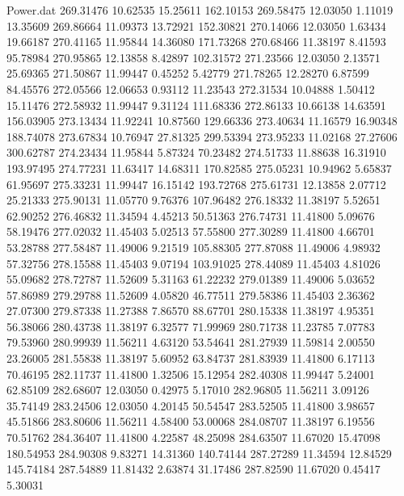 \begin{filecontents}{Power.dat}
 269.31476   10.62535   15.25611  162.10153
 269.58475   12.03050    1.11019   13.35609
 269.86664   11.09373   13.72921  152.30821
 270.14066   12.03050    1.63434   19.66187
 270.41165   11.95844   14.36080  171.73268
 270.68466   11.38197    8.41593   95.78984
 270.95865   12.13858    8.42897  102.31572
 271.23566   12.03050    2.13571   25.69365
 271.50867   11.99447    0.45252    5.42779
 271.78265   12.28270    6.87599   84.45576
 272.05566   12.06653    0.93112   11.23543
 272.31534   10.04888    1.50412   15.11476
 272.58932   11.99447    9.31124  111.68336
 272.86133   10.66138   14.63591  156.03905
 273.13434   11.92241   10.87560  129.66336
 273.40634   11.16579   16.90348  188.74078
 273.67834   10.76947   27.81325  299.53394
 273.95233   11.02168   27.27606  300.62787
 274.23434   11.95844    5.87324   70.23482
 274.51733   11.88638   16.31910  193.97495
 274.77231   11.63417   14.68311  170.82585
 275.05231   10.94962    5.65837   61.95697
 275.33231   11.99447   16.15142  193.72768
 275.61731   12.13858    2.07712   25.21333
 275.90131   11.05770    9.76376  107.96482
 276.18332   11.38197    5.52651   62.90252
 276.46832   11.34594    4.45213   50.51363
 276.74731   11.41800    5.09676   58.19476
 277.02032   11.45403    5.02513   57.55800
 277.30289   11.41800    4.66701   53.28788
 277.58487   11.49006    9.21519  105.88305
 277.87088   11.49006    4.98932   57.32756
 278.15588   11.45403    9.07194  103.91025
 278.44089   11.45403    4.81026   55.09682
 278.72787   11.52609    5.31163   61.22232
 279.01389   11.49006    5.03652   57.86989
 279.29788   11.52609    4.05820   46.77511
 279.58386   11.45403    2.36362   27.07300
 279.87338   11.27388    7.86570   88.67701
 280.15338   11.38197    4.95351   56.38066
 280.43738   11.38197    6.32577   71.99969
 280.71738   11.23785    7.07783   79.53960
 280.99939   11.56211    4.63120   53.54641
 281.27939   11.59814    2.00550   23.26005
 281.55838   11.38197    5.60952   63.84737
 281.83939   11.41800    6.17113   70.46195
 282.11737   11.41800    1.32506   15.12954
 282.40308   11.99447    5.24001   62.85109
 282.68607   12.03050    0.42975    5.17010
 282.96805   11.56211    3.09126   35.74149
 283.24506   12.03050    4.20145   50.54547
 283.52505   11.41800    3.98657   45.51866
 283.80606   11.56211    4.58400   53.00068
 284.08707   11.38197    6.19556   70.51762
 284.36407   11.41800    4.22587   48.25098
 284.63507   11.67020   15.47098  180.54953
 284.90308    9.83271   14.31360  140.74144
 287.27289   11.34594   12.84529  145.74184
 287.54889   11.81432    2.63874   31.17486
 287.82590   11.67020    0.45417    5.30031

\end{filecontents}
